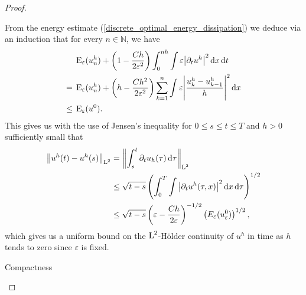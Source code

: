 \begin{proof}
\begin{description}[wide=0pt]
		From the energy estimate (\ref{discrete_optimal_energy_dissipation}) we 
		deduce via an induction that for every $ n \in \mathbb{ N } $, we have
		\begin{align}
			& \operatorname{E}_{ \varepsilon } ( u_{ n }^{ h } )
			+
			\left(
			1
			-
			\frac{ C h  }{ 2 \varepsilon^{ 2 } }
			\right)
			\int_{ 0 }^{ n h }
			\int
			\varepsilon
			\abs{ \partial_{ t } u^{ h } }^{ 2 }
			\dd{ x }
			\dd{ t }
			\notag
			\\
			={} &
			\operatorname{E}_{ \varepsilon } ( u_{ n }^{ h } )
			+
			\left(
			h - \frac{ C h^{ 2 }}{ 2 \varepsilon^{ 2 } }
			\right)
			\sum_{k = 1 }^{ n }
			\int
			\varepsilon
			\abs{
				\frac{ u_{ k }^{ h } - u_{ k - 1 }^{ h } }{ h }
			}^{ 2 }
			\dd{ x }
			\notag
			\\
			\label{energy_and_time_derivative_bound}
			\leq {} &
			\operatorname{E}_{ \varepsilon } ( u^{ 0 } ).
		\end{align}
		This gives us with the use of Jensen's inequality for $ 0\leq s \leq t 
		\leq T $ and $ h > 0 $ sufficiently small that
		\begin{align}
			\norm{ u^{ h } ( t ) - u^{ h } ( s ) }_{ \operatorname{L}^{ 2 } }
			& =
			\norm{ 
				\int_{ s }^{ t }
				\partial_{ t } u_{ h } ( \tau )
				\dd{ \tau }
			}_{ \operatorname{L}^{ 2 } }
			\notag
			\\
			& \leq
			\sqrt{ t - s }
			\left(	
			\int_{ 0 }^{ T }
			\int
			\abs{ \partial_{ t } u^{ h } ( \tau, x ) }^{ 2 }
			\dd{ x }
			\dd{ \tau }
			\right)^{ 1/2 }
			\notag
			\\
			\label{hölder_continuity_of_uh}
			& \leq
			\sqrt{ t - s }
			\left(
			\varepsilon - \frac{ C h }{ 2 \varepsilon }
			\right)^{ - 1/2 }
			\left(  E_{ \varepsilon } ( u_{ \varepsilon }^{ 0 } ) \right)^{ 1/ 2 },
		\end{align}
		which gives us a uniform bound on the $ \operatorname{L}^{ 2 }$-Hölder continuity of 
		$ u^{ h } $ in time as $ h $ tends to zero since $ \varepsilon $ is 
		fixed.
		
		\item[Step 5:] Compactness
		

\end{description}
\end{proof}
